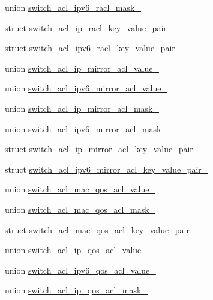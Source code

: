 \begin{DoxyCompactItemize}
\item 
union \hyperlink{unionswitch__acl__ipv6__racl__mask__}{switch\+\_\+acl\+\_\+ipv6\+\_\+racl\+\_\+mask\+\_\+}
\item 
struct \hyperlink{structswitch__acl__ip__racl__key__value__pair__}{switch\+\_\+acl\+\_\+ip\+\_\+racl\+\_\+key\+\_\+value\+\_\+pair\+\_\+}
\item 
struct \hyperlink{structswitch__acl__ipv6__racl__key__value__pair__}{switch\+\_\+acl\+\_\+ipv6\+\_\+racl\+\_\+key\+\_\+value\+\_\+pair\+\_\+}
\item 
union \hyperlink{unionswitch__acl__ip__mirror__acl__value__}{switch\+\_\+acl\+\_\+ip\+\_\+mirror\+\_\+acl\+\_\+value\+\_\+}
\item 
union \hyperlink{unionswitch__acl__ipv6__mirror__acl__value__}{switch\+\_\+acl\+\_\+ipv6\+\_\+mirror\+\_\+acl\+\_\+value\+\_\+}
\item 
union \hyperlink{unionswitch__acl__ip__mirror__acl__mask__}{switch\+\_\+acl\+\_\+ip\+\_\+mirror\+\_\+acl\+\_\+mask\+\_\+}
\item 
union \hyperlink{unionswitch__acl__ipv6__mirror__acl__mask__}{switch\+\_\+acl\+\_\+ipv6\+\_\+mirror\+\_\+acl\+\_\+mask\+\_\+}
\item 
struct \hyperlink{structswitch__acl__ip__mirror__acl__key__value__pair__}{switch\+\_\+acl\+\_\+ip\+\_\+mirror\+\_\+acl\+\_\+key\+\_\+value\+\_\+pair\+\_\+}
\item 
struct \hyperlink{structswitch__acl__ipv6__mirror__acl__key__value__pair__}{switch\+\_\+acl\+\_\+ipv6\+\_\+mirror\+\_\+acl\+\_\+key\+\_\+value\+\_\+pair\+\_\+}
\item 
union \hyperlink{unionswitch__acl__mac__qos__acl__value__}{switch\+\_\+acl\+\_\+mac\+\_\+qos\+\_\+acl\+\_\+value\+\_\+}
\item 
union \hyperlink{unionswitch__acl__mac__qos__acl__mask__}{switch\+\_\+acl\+\_\+mac\+\_\+qos\+\_\+acl\+\_\+mask\+\_\+}
\item 
struct \hyperlink{structswitch__acl__mac__qos__acl__key__value__pair__}{switch\+\_\+acl\+\_\+mac\+\_\+qos\+\_\+acl\+\_\+key\+\_\+value\+\_\+pair\+\_\+}
\item 
union \hyperlink{unionswitch__acl__ip__qos__acl__value__}{switch\+\_\+acl\+\_\+ip\+\_\+qos\+\_\+acl\+\_\+value\+\_\+}
\item 
union \hyperlink{unionswitch__acl__ipv6__qos__acl__value__}{switch\+\_\+acl\+\_\+ipv6\+\_\+qos\+\_\+acl\+\_\+value\+\_\+}
\item 
union \hyperlink{unionswitch__acl__ip__qos__acl__mask__}{switch\+\_\+acl\+\_\+ip\+\_\+qos\+\_\+acl\+\_\+mask\+\_\+}

\end{DoxyCompactItemize}
